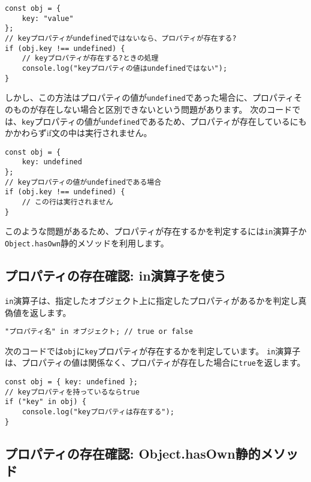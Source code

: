 \begin{lstlisting}
const obj = {
    key: "value"
};
// keyプロパティがundefinedではないなら、プロパティが存在する?
if (obj.key !== undefined) {
    // keyプロパティが存在する?ときの処理
    console.log("keyプロパティの値はundefinedではない");
}
\end{lstlisting}

しかし、この方法はプロパティの値が\texttt{undefined}であった場合に、プロパティそのものが存在しない場合と区別できないという問題があります。
次のコードでは、\texttt{key}プロパティの値が\texttt{undefined}であるため、プロパティが存在しているにもかかわらずif文の中は実行されません。

\begin{lstlisting}
const obj = {
    key: undefined
};
// keyプロパティの値がundefinedである場合
if (obj.key !== undefined) {
    // この行は実行されません
}
\end{lstlisting}

このような問題があるため、プロパティが存在するかを判定するには\texttt{in}演算子か\texttt{Object.hasOwn}静的メソッドを利用します。

\hypertarget{in-operator}{%
\subsection{プロパティの存在確認: in演算子を使う}\label{in-operator}}

\texttt{in}演算子は、指定したオブジェクト上に指定したプロパティがあるかを判定し真偽値を返します。

\begin{lstlisting}
"プロパティ名" in オブジェクト; // true or false
\end{lstlisting}

次のコードでは\texttt{obj}に\texttt{key}プロパティが存在するかを判定しています。
\texttt{in}演算子は、プロパティの値は関係なく、プロパティが存在した場合に\texttt{true}を返します。

\begin{lstlisting}
const obj = { key: undefined };
// keyプロパティを持っているならtrue
if ("key" in obj) {
    console.log("keyプロパティは存在する");
}
\end{lstlisting}

\hypertarget{object-hasown-method}{%
\subsection{プロパティの存在確認: Object.hasOwn静的メソッド\,\protect{}}\label{object-hasown-method}}

